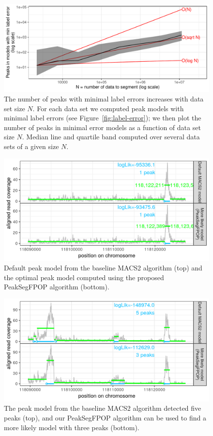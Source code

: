 \documentclass[article]{jss}
\begin{document}
\begin{figure}[t!]
\centering
\includegraphics{jss-figure-data-peaks}
\caption{\label{fig:data-peaks} The number of peaks with minimal label
  errors increases with data set size $N$. For each data set we
  computed peak models with minimal label errors (see
  Figure~\ref{fig:label-error}); we then plot the number of peaks in
  minimal error models as a function of data set size $N$. Median line
  and quartile band computed over several data sets of a given size
  $N$.}
\end{figure}
  
\begin{figure}[t!]
\centering
\includegraphics{jss-figure-more-likely-models-one-peak}
\caption{\label{fig:one-peak} Default peak model from the baseline
  MACS2 algorithm (top) and the optimal peak model computed using the
  proposed PeakSegFPOP algorithm (bottom).}
\end{figure}

\begin{figure}[t!]
\centering
\includegraphics{jss-figure-more-likely-models-three-peaks}
\caption{\label{fig:three-peaks} The peak model from the baseline
  MACS2 algorithm detected five peaks (top), and our PeakSegFPOP
  algorithm can be used to find a more likely model with three peaks
  (bottom).}
\end{figure}
 
\end{document}
